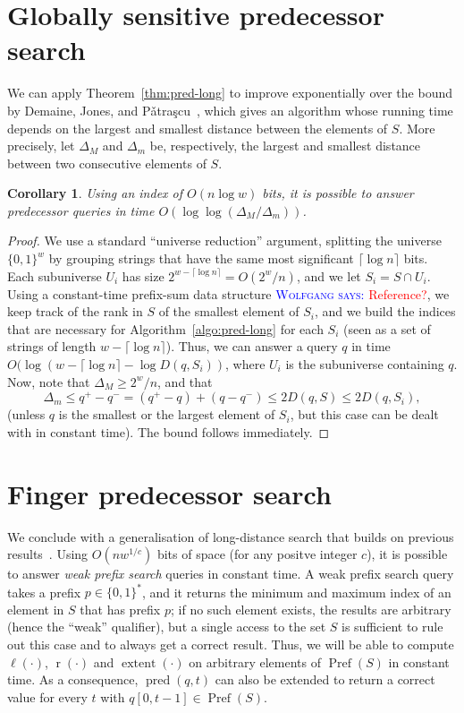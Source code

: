 \documentclass[a4paper,11pt]{article}
\newtheorem{corollary}[theorem]{Corollary}
\newcommand{\?}{\mskip1.5mu}
\newcommand{\Patrascu}{P\v{a}tra\c{s}cu\xspace}
\DeclareMathOperator{\lrange}{\ell}
\DeclareMathOperator{\rrange}{r}
\DeclareMathOperator{\extent}{extent}
\DeclareMathOperator{\Pref}{Pref}
\DeclareMathOperator{\pred}{pred}
\newcommand{\aremark}[3]{\textcolor{blue}{\textsc{#1 #2:}}
  \textcolor{red}{\textsf{#3}}}
\newcommand{\wolfgang}[2][says]{\aremark{Wolfgang}{#1}{#2}}
\begin{document}
\section{Globally sensitive predecessor search}

We can apply Theorem~\ref{thm:pred-long} to improve 
exponentially over the bound by Demaine, Jones, and 
\Patrascu~\cite{DemaineJoPa04}, which gives an algorithm whose running time
depends on the largest and smallest distance between the elements of $S$. 
More precisely, let
$\Delta_M$ and $\Delta_m$ be, respectively, the largest and smallest distance
between two consecutive elements of $S$.
\begin{corollary}
\label{cor:deltadelta}
Using an index of $O(n\log w)$ bits, it is possible to answer predecessor
queries in time $O(\log\log(\Delta_M/\Delta_m))$.
\end{corollary}
\begin{proof}
We use a standard ``universe reduction'' argument, splitting 
the universe $\{0, 1\}^w$ by grouping strings that have the same 
most significant $\lceil \log
n\rceil$ bits. Each subuniverse $U_i$ has size 
$2^{w-\lceil \log n\rceil}=O(2^w/n)$, and we let $S_i=S\cap U_i$. 
Using a constant-time
prefix-sum data structure \wolfgang{Reference?}, 
we keep track of the rank in $S$ of the smallest
element of $S_i$, and we build the indices that are necessary for
Algorithm~\ref{algo:pred-long} for each $S_i$ 
(seen as a set of strings of
length $w-\lceil \log
n\rceil$). 
Thus, we can answer a query $q$ in time 
$O(\log(w-\lceil \log n\rceil -\log D(q, S_i))$, where 
$U_i$ is the subuniverse containing $q$. Now,
note that $\Delta_M \geq 2^w/n$, and that 
\[
\Delta_m \leq q^+ - q^- = (q^+ - q) + (q - q^-)
\leq 2D(q, S) \leq 2D(q, S_i),
\]
(unless $q$ is the smallest or the
largest element of $S_i$, but this case can be dealt with in constant time). 
The bound follows immediately.
\end{proof}

\section{Finger predecessor search}

We conclude with a generalisation of long-distance search 
that builds on previous results~\cite{BelazzouguiBoPaVi11b}.
Using $O(n w^{1/c})$ bits of space (for any positve integer $c$), 
it is possible to answer \emph{weak prefix search} queries in 
constant time. A weak prefix search query takes a prefix 
$p \in \{0, 1\}^*$, and it returns the minimum and maximum
index of an element in $S$ that has prefix $p$; if no such element exists,
the results are arbitrary (hence the ``weak'' qualifier), but 
a single access to the set $S$ is sufficient
to rule out this case and to always get a correct result. Thus, we will be
able to compute $\lrange(\cdot)$, $\rrange(\cdot)$ and $\extent(\cdot)$ 
on arbitrary elements of $\Pref(S)$ in constant time. 
As a consequence, $\pred(q,t)$ can also
be extended to return a correct value for every $t$ with 
$q[0, t - 1] \in \Pref(S)$.
\end{document}
